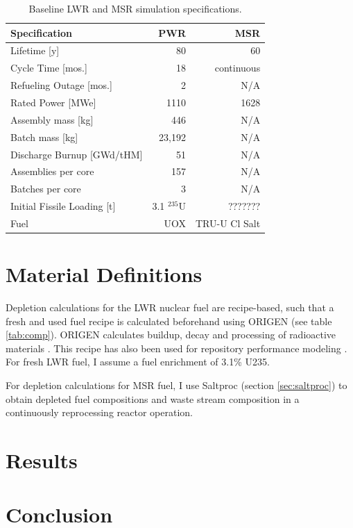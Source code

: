 \begin{table}[h]
	\centering
	\caption{Baseline \gls{LWR} and \gls{MSR} simulation specifications.}
	\begin{tabular}{lrr}
		\hline
		\textbf{Specification} & \textbf{\gls{PWR} \cite{sutharshan_ap1000tm_2011}} & \textbf{\gls{MSR} \cite{mourogov_potentialities_2006}} \\
		\hline
		Lifetime [y]  & 80 & 60 \\
		Cycle Time [mos.]& 18 & continuous \\ 
		Refueling Outage [mos.]& 2 & N/A \\
		Rated Power [\gls{MWe}] & 1110 & 1628 \\
		Assembly mass [kg] & 446 & N/A \\
		Batch mass [kg] & 23,192 & N/A \\
		Discharge Burnup [GWd/tHM] & 51 & N/A \\
		Assemblies per core & 157  & N/A \\
		Batches per core & 3 & N/A \\
		Initial Fissile Loading [t] & 3.1  $^{235}$U & ??????? \\
		Fuel & \gls{UOX} & \gls{TRU}-U Cl Salt \\
		\hline
	\end{tabular}
	
	\label{tab:us-reactor-specs}
	
\end{table}


\section{Material Definitions}
Depletion calculations for the \gls{LWR} nuclear fuel are recipe-based, such 
that a fresh and used fuel recipe is calculated beforehand using ORIGEN (see table \ref{tab:comp}).
ORIGEN calculates buildup, decay and processing of radioactive materials
\cite{parks_overview_1992}. This recipe has also been used for
repository performance modeling \cite{wilson_adoption_2009}.
For fresh \gls{LWR} fuel, I assume a fuel enrichment of 3.1\% U235.

For depletion calculations for \gls{MSR} fuel, I use Saltproc (section \ref{sec:saltproc})
to obtain depleted fuel compositions and waste stream composition in a continuously
reprocessing reactor operation.


\section{Results}

\section{Conclusion}